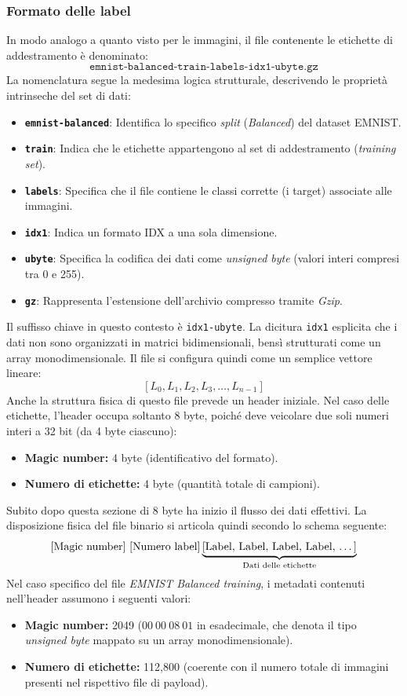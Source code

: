 \documentclass[12pt,a4paper]{article}
\begin{document}
	\subsubsection{Formato delle label}
	In modo analogo a quanto visto per le immagini, il file contenente le etichette di addestramento è denominato:$$\texttt{emnist-balanced-train-labels-idx1-ubyte.gz}$$
	La nomenclatura segue la medesima logica strutturale, descrivendo le proprietà intrinseche del set di dati:
	\begin{itemize}
		\item \textbf{\texttt{emnist-balanced}}: Identifica lo specifico \textit{split} (\textit{Balanced}) del dataset EMNIST.
		\item \textbf{\texttt{train}}: Indica che le etichette appartengono al set di addestramento (\textit{training set}).
		\item \textbf{\texttt{labels}}: Specifica che il file contiene le classi corrette (i target) associate alle immagini.
		\item \textbf{\texttt{idx1}}: Indica un formato IDX a una sola dimensione.
		\item \textbf{\texttt{ubyte}}: Specifica la codifica dei dati come \textit{unsigned byte} (valori interi compresi tra 0 e 255).
		\item \textbf{\texttt{gz}}: Rappresenta l'estensione dell'archivio compresso tramite \textit{Gzip}.
	\end{itemize}

	Il suffisso chiave in questo contesto è \texttt{idx1-ubyte}. La dicitura \texttt{idx1} esplicita che i dati non sono organizzati in matrici bidimensionali, bensì strutturati come un array monodimensionale. Il file si configura quindi come un semplice vettore lineare:$$[L_0, L_1, L_2, L_3, \dots, L_{n-1}]$$Anche la struttura fisica di questo file prevede un header iniziale. Nel caso delle etichette, l'header occupa soltanto 8 byte, poiché deve veicolare due soli numeri interi a 32 bit (da 4 byte ciascuno):
	\begin{itemize}
		\item \textbf{Magic number:} 4 byte (identificativo del formato).
		\item \textbf{Numero di etichette:} 4 byte (quantità totale di campioni).
	\end{itemize}

	Subito dopo questa sezione di 8 byte ha inizio il flusso dei dati effettivi. La disposizione fisica del file binario si articola quindi secondo lo schema seguente:$$\text{[Magic number]} \ \text{[Numero label]} \underbrace{\text{[Label, Label, Label, Label, \dots]}}_{\text{Dati delle etichette}}$$
	Nel caso specifico del file \textit{EMNIST Balanced training}, i metadati contenuti nell'header assumono i seguenti valori:
	\begin{itemize}
		\item \textbf{Magic number:} 2049 ($00\ 00\ 08\ 01$ in esadecimale, che denota il tipo \textit{unsigned byte} mappato su un array monodimensionale).
		\item \textbf{Numero di etichette:} 112,800 (coerente con il numero totale di immagini presenti nel rispettivo file di payload).
	\end{itemize}
\end{document}
